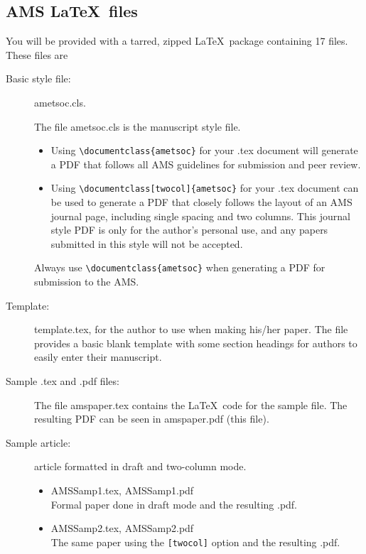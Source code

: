 \documentclass{ametsoc}
\begin{document}
\subsection{AMS \LaTeX\ files}
You will be provided with a tarred, zipped \LaTeX\ package containing 
17 files. These files are

\begin{description}
\item[Basic style file:] ametsoc.cls. 

The file ametsoc.cls is the manuscript style file.  

\begin{itemize}
\item
Using \verb+\documentclass{ametsoc}+ for your .tex document
will 
generate a PDF that follows all AMS guidelines for submission and peer
review.  

\item
Using \verb+\documentclass[twocol]{ametsoc}+ for your .tex document
can be used to generate a PDF that closely
follows the layout of an AMS journal page, including single spacing and two
columns.  This journal style PDF is only for the author's personal use, and
any papers submitted in this style will not be accepted.  
\end{itemize}
Always use \verb+\documentclass{ametsoc}+ 
when generating a PDF for submission to the AMS. 

\item[Template:]
template.tex, for the author to use when making his/her
paper.
The file provides a basic blank template with some
section headings for authors to easily enter their manuscript.

\item[Sample .tex and .pdf files:]
The file amspaper.tex contains the \LaTeX\ code for the sample file.  
The resulting PDF can be seen in amspaper.pdf (this file).


\item[Sample article:] article formatted in draft and two-column mode.

\begin{itemize}
\item
AMSSamp1.tex, AMSSamp1.pdf\\
Formal paper done in draft mode and the resulting .pdf.

\item
AMSSamp2.tex, AMSSamp2.pdf \\
The same paper using the \verb+[twocol]+ option and the resulting .pdf.


\end{itemize}
\end{description}
\end{document}
